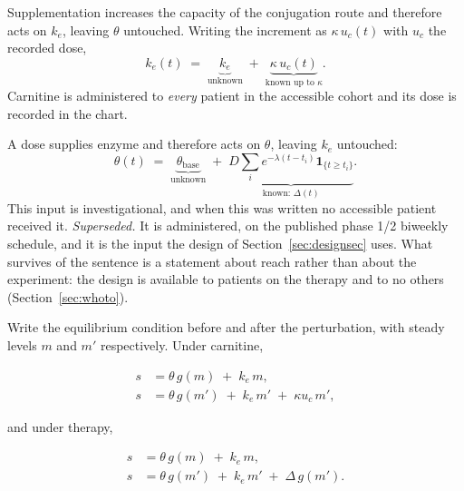 \begin{description}[leftmargin=1.4em, itemsep=2pt]
\item[Carnitine.] Supplementation increases the capacity of the conjugation route and
therefore acts on $k_e$, leaving $\theta$ untouched. Writing the increment as
$\kappa\, u_c(t)$ with $u_c$ the recorded dose,
\begin{equation}
k_e(t) \;=\; \underbrace{k_e}_{\text{unknown}} \;+\;
\underbrace{\kappa\, u_c(t)}_{\text{known up to }\kappa}.
\label{eq:input_carn}
\end{equation}
Carnitine is administered to \emph{every} patient in the accessible cohort and its dose is
recorded in the chart.
\item[mRNA therapy.] A dose supplies enzyme and therefore acts on $\theta$, leaving $k_e$
untouched:
\begin{equation}
\theta(t) \;=\; \underbrace{\theta_{\mathrm{base}}}_{\text{unknown}}
\;+\; \underbrace{D \sum_i e^{-\lambda (t - t_i)} \mathbf{1}_{\{t \ge t_i\}}}_{\text{known: } \Delta(t)}.
\label{eq:input}
\end{equation}
This input is investigational, and when this was written no accessible patient received
it. \emph{Superseded.} It is administered, on the published phase 1/2 biweekly schedule,
and it is the input the design of Section~\ref{sec:designsec} uses. What survives of the
sentence is a statement about reach rather than about the experiment: the design is
available to patients on the therapy and to no others (Section~\ref{sec:whoto}).
\end{description}

Write the equilibrium condition before and after the perturbation, with steady levels $m$
and $m'$ respectively. Under carnitine,

\begin{equation}
\begin{aligned}
s &= \theta\, g(m) \;+\; k_e\, m, \\
s &= \theta\, g(m') \;+\; k_e\, m' \;+\; \kappa u_c\, m',
\end{aligned}
\label{eq:twoeq_carn}
\end{equation}

and under therapy,

\begin{equation}
\begin{aligned}
s &= \theta\, g(m) \;+\; k_e\, m, \\
s &= \theta\, g(m') \;+\; k_e\, m' \;+\; \Delta\, g(m').
\end{aligned}
\label{eq:twoeq}
\end{equation}

